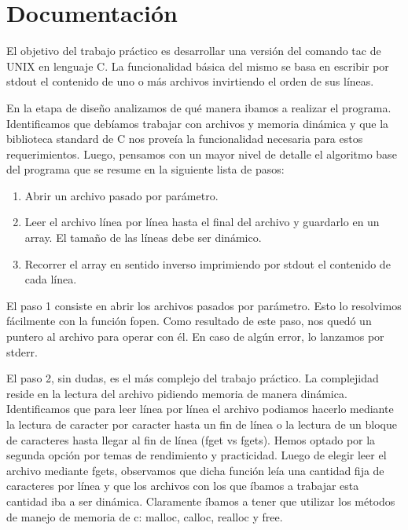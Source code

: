 \documentclass[a4paper,11pt]{article}
\begin{document}
\section{Documentaci\'on}
El objetivo del trabajo pr\'actico es desarrollar una versi\'on del comando tac de UNIX en lenguaje C. La funcionalidad b\'asica del mismo se basa en escribir por stdout el contenido de uno o m\'as archivos invirtiendo el orden de sus l\'ineas.

En la etapa de dise\~no analizamos de qu\'e manera ibamos a realizar el programa. Identificamos que deb\'iamos trabajar con archivos y memoria din\'amica y que la biblioteca standard de C nos prove\'ia la funcionalidad necesaria para estos requerimientos. Luego, pensamos con un mayor nivel de detalle el algoritmo base del programa que se resume en la siguiente lista de pasos:
\begin{enumerate}
	\item Abrir un archivo pasado por par\'ametro.
	\item Leer el archivo l\'inea por l\'inea hasta el final del archivo y guardarlo en un array. El tama\~no de las l\'ineas debe ser din\'amico.
	\item Recorrer el array en sentido inverso imprimiendo por stdout el contenido de cada l\'inea.
\end{enumerate}

El paso 1 consiste en abrir los archivos pasados por par\'ametro. Esto lo resolvimos f\'acilmente con la funci\'on fopen. Como resultado de este paso, nos qued\'o un puntero al archivo para operar con \'el. En caso de alg\'un error, lo lanzamos por stderr.

El paso 2, sin dudas, es el m\'as complejo del trabajo pr\'actico. La complejidad reside en la lectura del archivo pidiendo memoria de manera din\'amica. 
Identificamos que para leer l\'inea por l\'inea el archivo podiamos hacerlo mediante la lectura de caracter por caracter hasta un fin de l\'inea o la lectura de un bloque de caracteres hasta llegar al fin de l\'inea (fget vs fgets). Hemos optado por la segunda opci\'on por temas de rendimiento y practicidad.
Luego de elegir leer el archivo mediante fgets, observamos que dicha funci\'on le\'ia una cantidad fija de caracteres por l\'inea y que los archivos con los que \'ibamos a trabajar esta cantidad iba a ser din\'amica. Claramente \'ibamos a tener que utilizar los m\'etodos de manejo de memoria de c: malloc, calloc, realloc y free.
\end{document}
